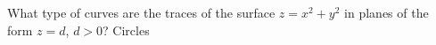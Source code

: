{What type of curves are the traces of the surface $z=x^2+y^2$ in planes of the form $z=d$, $d>0$?
}
{Circles
}
